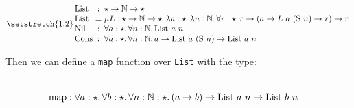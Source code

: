 \begin{equation*}
\setlength{\arraycolsep}{1.5pt}
\setstretch{1.2}
\begin{array}{lcl}
\List &:& \star \rightarrow \Nat \rightarrow \star \\
\List &=& \mu L : \star \rightarrow \Nat \rightarrow \star.\, \lambda a:\star.\, \lambda n :\Nat.\, \forall r:\star.\, r \rightarrow (a \rightarrow L~a~(\Succ ~ n) \rightarrow r) \rightarrow r \\
\Nil &:& \forall a : \star.\, \forall n : \Nat.\, \List ~ a ~ n \\
\Cons &:& \forall a : \star.\, \forall n : \Nat.\, a \rightarrow \List ~ a ~ (\Succ ~ n) \rightarrow \List ~ a ~n \\
\end{array}
\end{equation*}

\noindent Then we can define a \verb|map| function over \verb|List| with the type:

\begin{align*}
  \\
  & \mathrm{map} : \forall a : \star.\, \forall b : \star.\, \forall n : \mathbb{N} : \star.\, (a \rightarrow b) \rightarrow \mathrm{List}~a~n \rightarrow \mathrm{List}~b~n \\
\end{align*}


